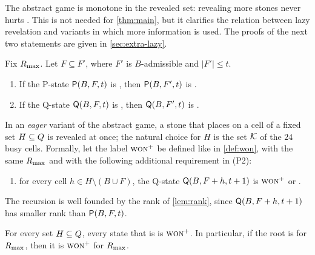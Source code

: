 The abstract game is monotone in the revealed set: revealing more stones never hurts \Breaker. This is not
needed for \cref{thm:main}, but it clarifies the relation between lazy revelation and variants in
which more information is used. The proofs of the next two statements are given in
\cref{sec:extra-lazy}.

\begin{proposition}\label{prop:lazy-monotone}
Fix $R_{\max}$. Let $F\subseteq F'$, where $F'$ is $B$-admissible and $|F'|\le t$.
\begin{enumerate}[label=\textup{(\alph*)},leftmargin=2.4em]
\item If the P-state $\mathsf{P}(B,F,t)$ is \WON, then $\mathsf{P}(B,F',t)$ is \WON.
\item If the Q-state $\mathsf{Q}(B,F,t)$ is \WON, then $\mathsf{Q}(B,F',t)$ is \WON.
\end{enumerate}
\end{proposition}

In an \emph{eager} variant of the abstract game, a stone that \Maker{} places on a cell of a fixed set
$H\subseteq Q$ is revealed at once; the natural choice for $H$ is the set $\mathcal{K}$ of the $24$ busy cells. Formally, let the label $\textup{\textsc{won}}^{+}$ be defined like \WON{} in
\cref{def:won}, with the same $R_{\max}$ and with the following additional requirement in (P2):
\begin{enumerate}[leftmargin=2.6em]
\item[\textup{(b)}] for every cell $h\in H\setminus(B\cup F)$, the Q-state $\mathsf{Q}(B,F+h,t+1)$ is $\textup{\textsc{won}}^{+}$ or
  \VOID.
\end{enumerate}
The recursion is well founded by the rank of \cref{lem:rank}, since $\mathsf{Q}(B,F+h,t+1)$ has smaller rank
than $\mathsf{P}(B,F,t)$.

\begin{corollary}\label{cor:eager}
For every set $H\subseteq Q$, every state that is \WON{} is $\textup{\textsc{won}}^{+}$. In particular, if the root is \WON{} for
$R_{\max}$, then it is $\textup{\textsc{won}}^{+}$ for $R_{\max}$.
\end{corollary}

